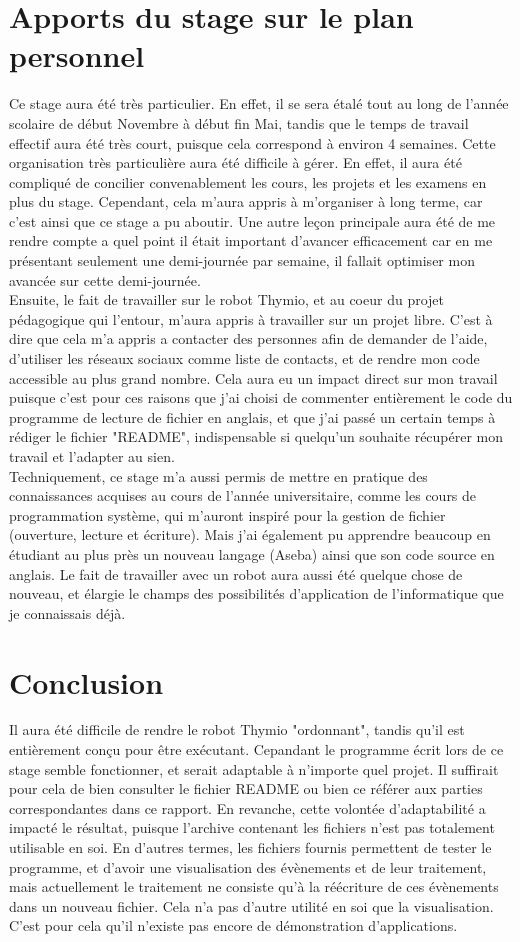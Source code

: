 \documentclass[a4paper, 12pt]{report}
\begin{document}
\section{Apports du stage sur le plan personnel}
Ce stage aura été très particulier. En effet, il se sera étalé tout au long de l'année scolaire de début Novembre à début fin Mai, tandis que le temps de travail effectif aura été très court, puisque cela correspond à environ 4 semaines. Cette organisation très particulière aura été difficile à gérer. En effet, il aura été compliqué de concilier convenablement les cours, les projets et les examens en plus du stage. Cependant, cela m'aura appris à m'organiser à long terme, car c'est ainsi que ce stage a pu aboutir. Une autre leçon principale aura été de me rendre compte a quel point il était important d'avancer efficacement car en me présentant seulement une demi-journée par semaine, il fallait optimiser mon avancée sur cette demi-journée.\\
Ensuite, le fait de travailler sur le robot Thymio, et au coeur du projet pédagogique qui l'entour, m'aura appris à travailler sur un projet libre. C'est à dire que cela m'a appris a contacter des personnes afin de demander de l'aide, d'utiliser les réseaux sociaux comme liste de contacts, et de rendre mon code accessible au plus grand nombre. Cela aura eu un impact direct sur mon travail puisque c'est pour ces raisons que j'ai choisi de commenter entièrement le code du programme de lecture de fichier en anglais, et que j'ai passé un certain temps à rédiger le fichier "README", indispensable si quelqu'un souhaite récupérer mon travail et l'adapter au sien.\\
Techniquement, ce stage m'a aussi permis de mettre en pratique des connaissances acquises au cours de l'année universitaire, comme les cours de programmation système, qui m'auront inspiré pour la gestion de fichier (ouverture, lecture et écriture). Mais j'ai également pu apprendre beaucoup en étudiant au plus près un nouveau langage (Aseba) ainsi que son code source en anglais. Le fait de travailler avec un robot aura aussi été quelque chose de nouveau, et élargie le champs des possibilités d'application de l'informatique que je connaissais déjà. 
\section{Conclusion}
Il aura été difficile de rendre le robot Thymio "ordonnant", tandis qu'il est entièrement conçu pour être exécutant. Cepandant le programme écrit lors de ce stage semble fonctionner, et serait adaptable à n'importe quel projet. Il suffirait pour cela de bien consulter le fichier README ou bien ce référer aux parties correspondantes dans ce rapport. En revanche, cette volontée d'adaptabilité a impacté le résultat, puisque l'archive contenant les fichiers n'est pas totalement utilisable en soi. En d'autres termes, les fichiers fournis permettent de tester le programme, et d'avoir une visualisation des évènements et de leur traitement, mais actuellement le traitement ne consiste qu'à la réécriture de ces évènements dans un nouveau fichier. Cela n'a pas d'autre utilité en soi que la visualisation. C'est pour cela qu'il n'existe pas encore de démonstration d'applications.
\end{document}
